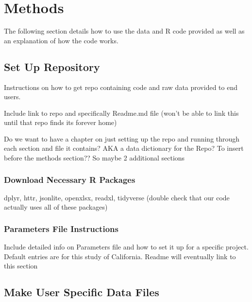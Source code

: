 \documentclass[
]{book}
\begin{document}
\hypertarget{methods}{%
\chapter{Methods}\label{methods}}

The following section details how to use the data and R code provided as well as an explanation of how the code works.

\hypertarget{set-up-repository}{%
\section{Set Up Repository}\label{set-up-repository}}

Instructions on how to get repo containing code and raw data provided to end users.

Include link to repo and specifically Readme.md file (won't be able to link this until that repo finds its forever home)

Do we want to have a chapter on just setting up the repo and running through each section and file it contains? AKA a data dictionary for the Repo? To insert before the methods section??
So maybe 2 additional sections

\hypertarget{download-necessary-r-packages}{%
\subsection{Download Necessary R Packages}\label{download-necessary-r-packages}}

dplyr, httr, jsonlite, openxlsx, readxl, tidyverse (double check that our code actually uses all of these packages)

\hypertarget{parameters-file-instructions}{%
\subsection{Parameters File Instructions}\label{parameters-file-instructions}}

Include detailed info on Parameters file and how to set it up for a specific project. Default entries are for this study of California.
Readme will eventually link to this section

\hypertarget{make-user-specific-data-files}{%
\section{Make User Specific Data Files}\label{make-user-specific-data-files}}
\end{document}
